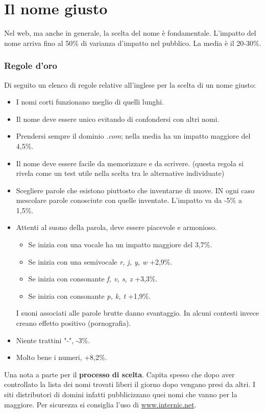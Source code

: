 
\chapter{Il nome giusto}
	Nel web, ma anche in generale, la scelta del nome è fondamentale. L'impatto del nome arriva fino al 50\% di varianza d'impatto nel pubblico. La media è il 20-30\%. 
		
		\subsection{Regole d'oro}
			Di seguito un elenco di regole relative all'inglese per la scelta di un nome giusto:
			\begin{itemize}
				\item I nomi corti funzionano meglio di quelli lunghi.
				\item Il nome deve essere unico evitando di confondersi con altri nomi.
				\item Prendersi sempre il dominio \emph{.com}; nella media ha un impatto maggiore del 4,5\%.
				\item Il nome deve essere facile da memorizzare e da scrivere. (questa regola si rivela come un test utile nella scelta tra le alternative individuate)
				\item Scegliere parole che esistono piuttosto che inventarne di nuove. IN ogni caso mescolare parole conosciute con quelle inventate. L'impatto va da -5\% a 1,5\%.
				\item Attenti al suono della parola, deve essere piacevole e armonioso.
					\begin{itemize}
						\item Se inizia con una vocale ha un impatto maggiore del 3,7\%.
						\item Se inizia con una semivocale \emph{r, j, y, w} +2,9\%.
						\item Se inizia con consonante \emph{f, v, s, z} +3,3\%.
						\item Se inizia con consonante \emph{p, k, t} +1,9\%.
					\end{itemize}
					I suoni associati alle parole brutte danno svantaggio. In alcuni contesti invece creano effetto positivo (pornografia).
				\item Niente trattini "-", -3\%.
				\item Molto bene i numeri, +8,2\%.
			\end{itemize}
			Una nota a parte per il \textbf{processo di scelta}. Capita spesso che dopo aver controllato la lista dei nomi trovati liberi il giorno dopo vengano presi da altri. I siti distributori di domini infatti pubblicizzano quei nomi che vanno per la maggiore. Per sicurezza si consiglia l'uso di \href{https://www.internic.net/index.html}{www.internic.net}.
	
